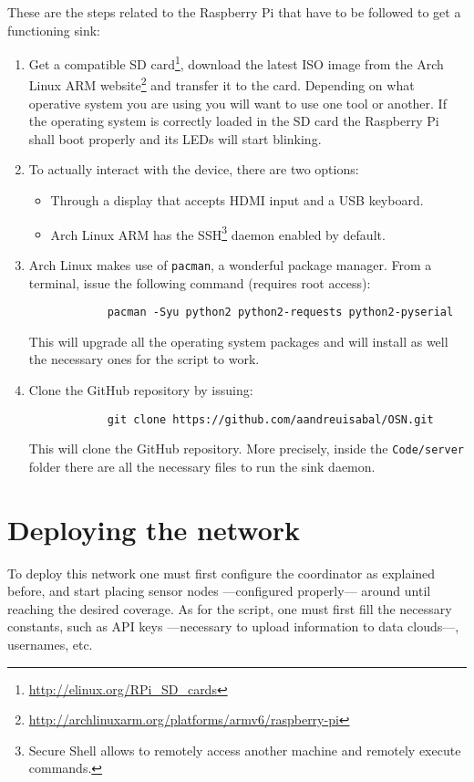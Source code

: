 These are the steps related to the Raspberry Pi that have to be followed to get a functioning sink:

\begin{enumerate}
    \item Get a compatible SD card\footnote{\url{http://elinux.org/RPi_SD_cards}}, download the latest ISO image from the Arch Linux ARM website\footnote{\url{http://archlinuxarm.org/platforms/armv6/raspberry-pi}} and transfer it to the card. Depending on what operative system you are using you will want to use one tool or another. If the operating system is correctly loaded in the SD card the Raspberry Pi shall boot properly and its LEDs will start blinking.
    \item To actually interact with the device, there are two options:
        \begin{itemize}
            \item Through a display that accepts HDMI input and a USB keyboard.
            \item Arch Linux ARM has the SSH\footnote{Secure Shell allows to remotely access another machine and remotely execute commands.} daemon enabled by default.
        \end{itemize}
    \item Arch Linux makes use of \texttt{pacman}, a wonderful package manager. From a terminal, issue the following command (requires root access): 
        \begin{verbatim}
            pacman -Syu python2 python2-requests python2-pyserial
        \end{verbatim}
    This will upgrade all the operating system packages and will install as well the necessary ones for the script to work.
    \item Clone the GitHub repository by issuing: 
        \begin{verbatim}
            git clone https://github.com/aandreuisabal/OSN.git
        \end{verbatim} 
    This will clone the GitHub repository. More precisely, inside the \texttt{Code/server} folder there are all the necessary files to run the sink daemon.
\end{enumerate}



\section{Deploying the network}

To deploy this network one must first configure the coordinator as explained before, and start placing sensor nodes ---configured properly--- around until reaching the desired coverage. As for the script, one must first fill the necessary constants, such as API keys ---necessary to upload information to data clouds---, usernames, etc.
